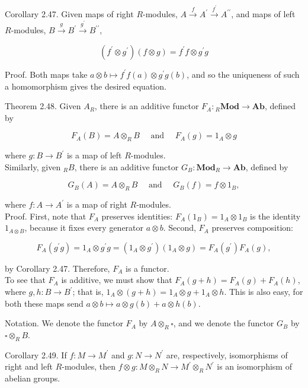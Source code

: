 \documentclass[10pt, letterpaper]{article}
\begin{document}
Corollary 2.47. Given maps of right $R$-modules, $A \xrightarrow{f} A^{\prime} \xrightarrow{f^{\prime}} A^{\prime \prime}$, and maps of left $R$-modules, $B \xrightarrow{g} B^{\prime} \xrightarrow{g^{\prime}} B^{\prime \prime}$,

$$
\left(f^{\prime} \otimes g^{\prime}\right)(f \otimes g)=f^{\prime} f \otimes g^{\prime} g
$$

Proof. Both maps take $a \otimes b \mapsto f^{\prime} f(a) \otimes g^{\prime} g(b)$, and so the uniqueness of such a homomorphism gives the desired equation.

Theorem 2.48. Given $A_{R}$, there is an additive functor $F_{A}:{ }_{R} \mathbf{M o d} \rightarrow \mathbf{A b}$, defined by

$$
F_{A}(B)=A \otimes_{R} B \quad \text { and } \quad F_{A}(g)=1_{A} \otimes g
$$

where $g: B \rightarrow B^{\prime}$ is a map of left $R$-modules.\\
Similarly, given ${ }_{R} B$, there is an additive functor $G_{B}: \mathbf{M o d}_{R} \rightarrow \mathbf{A b}$, defined by

$$
G_{B}(A)=A \otimes_{R} B \quad \text { and } \quad G_{B}(f)=f \otimes 1_{B},
$$

where $f: A \rightarrow A^{\prime}$ is a map of right $R$-modules.\\
Proof. First, note that $F_{A}$ preserves identities: $F_{A}\left(1_{B}\right)=1_{A} \otimes 1_{B}$ is the identity $1_{A \otimes B}$, because it fixes every generator $a \otimes b$. Second, $F_{A}$ preserves composition:

$$
F_{A}\left(g^{\prime} g\right)=1_{A} \otimes g^{\prime} g=\left(1_{A} \otimes g^{\prime}\right)\left(1_{A} \otimes g\right)=F_{A}\left(g^{\prime}\right) F_{A}(g),
$$

by Corollary 2.47. Therefore, $F_{A}$ is a functor.\\
To see that $F_{A}$ is additive, we must show that $F_{A}(g+h)=F_{A}(g)+F_{A}(h)$, where $g, h: B \rightarrow B^{\prime}$; that is, $1_{A} \otimes(g+h)=1_{A} \otimes g+1_{A} \otimes h$. This is also easy, for both these maps send $a \otimes b \mapsto a \otimes g(b)+a \otimes h(b)$.

Notation. We denote the functor $F_{A}$ by $A \otimes_{R} \square$, and we denote the functor $G_{B}$ by $\square \otimes_{R} B$.

Corollary 2.49. If $f: M \rightarrow M^{\prime}$ and $g: N \rightarrow N^{\prime}$ are, respectively, isomorphisms of right and left $R$-modules, then $f \otimes g: M \otimes_{R} N \rightarrow M^{\prime} \otimes_{R} N^{\prime}$ is an isomorphism of abelian groups.
\end{document}
